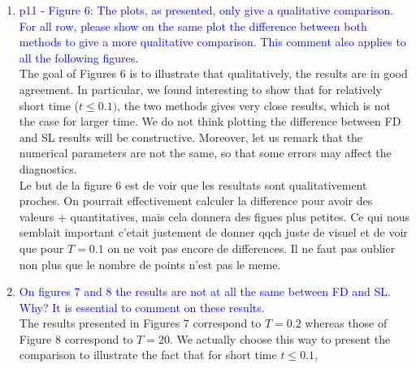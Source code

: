 \documentclass{article}
\begin{document}
\begin{enumerate}
\begin{enumerate}
{on the results for the different cases should at least be added.}\\ 
\textcolor{red}{Je ne comprends pas bien : des comparisons entre Run0-SL et Run0-FD sont faites en Figure 8 sur des temps longs 
($T=20$) alors que sur les resultats dans Figures 6-7 en temps court ($T=0.1, 0.2$) comparent Run2-SL avec Run0-FD, ce qui n'est pas 
vraiment en faveur de FD. C'est \c{c}a qu'il questionne ?} \\ 
{\small Run2 est + converge que Run0; donc si on le compare a Run0-FD et que cela donne la meme chose, cela voudra dire que Run0-FD est converge, independamment du nombre de points (Ce qui n'est pas le cas, si on compare avec run0).  
Nous pourrons rajouter des explications sur les resultats.}
\end{enumerate}
    \item \textcolor{blue}{p11 - Figure 6: The plots, as presented, only give a qualitative comparison. For all row, please show on the same plot the difference between both methods to give a more
qualitative comparison. This comment also applies to all the following figures.}\\
The goal of Figures 6 is to illustrate that qualitatively, the results are  in good agreement. In particular, we found interesting to show that 
for relatively short time ($t\leq 0.1)$, the two methods gives very close results, which is not the case for larger time. 
We do not think plotting the difference between FD and SL results will be constructive. Moreover, let us remark that 
the numerical parameters are not the same, so that some errors may affect the diagnostics. \\ %
{\small Le but de la figure 6 est de voir que les resultats sont qualitativement proches. On pourrait effectivement calculer la difference pour avoir des valeurs + quantitatives, mais cela donnera des figues plus petites.
Ce qui nous semblait important c'etait justement de donner qqch juste de visuel et de voir que pour $T=0.1$ on ne voit pas encore de differences.
Il ne faut pas oublier non plus que le nombre de points n'est pas le meme. }
    \item \textcolor{blue}{On figures 7 and 8 the results are not at all the same between FD and SL. Why? It is
essential to comment on these results.} \\
The results presented in Figures 7 correspond to $T=0.2$ whereas those of Figure 8 correspond to $T=20$. 
We actually choose this way to present the comparison to illustrate the fact that for short time $t\leq 0.1$, 

\end{enumerate}
\end{document}
